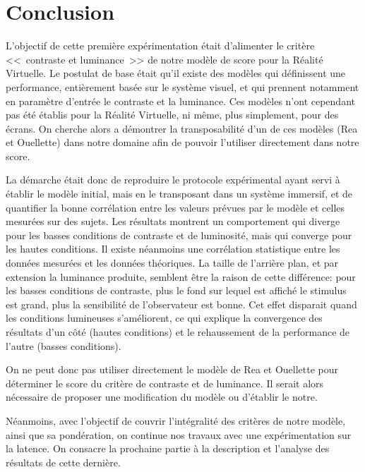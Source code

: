 \chapter*{Conclusion}
\par L'objectif de cette première expérimentation était d'alimenter le critère <<~contraste et luminance~>> de notre modèle de score pour la Réalité Virtuelle. Le postulat de base était qu'il existe des modèles qui définissent une performance, entièrement basée sur le système visuel, et qui prennent notamment en paramètre d'entrée le contraste et la luminance. Ces modèles n'ont cependant pas été établis pour la Réalité Virtuelle, ni même, plus simplement, pour des écrans. On cherche alors a démontrer la transposabilité d'un de ces modèles (Rea et Ouellette) dans notre domaine afin de pouvoir l'utiliser directement dans notre score.

\par La démarche était donc de reproduire le protocole expérimental ayant servi à établir le modèle initial, mais en le transposant  dans un système immersif, et de quantifier la bonne corrélation entre les valeurs prévues par le modèle et celles mesurées sur des sujets. Les résultats montrent un comportement qui diverge pour les basses conditions de contraste et de luminosité, mais qui converge pour les hautes conditions. Il existe néanmoins une corrélation statistique entre les données mesurées et les données théoriques. La taille de l'arrière plan, et par extension la luminance produite, semblent être la raison de cette différence: pour les basses conditions de contraste, plus le fond sur lequel est affiché le stimulus est grand, plus la sensibilité de l'observateur est bonne. Cet effet disparait quand les conditions lumineuses s'améliorent, ce qui explique la convergence des résultats d'un côté (hautes conditions) et le rehaussement de la performance de l'autre (basses conditions).

\par On ne peut donc pas utiliser directement le modèle de Rea et Ouellette pour déterminer le score du critère de contraste et de luminance. Il serait alors nécessaire de proposer une modification du modèle ou d'établir le notre.

\par Néanmoins, avec l'objectif de couvrir l'intégralité des critères de notre modèle, ainsi que sa pondération, on continue nos travaux avec une expérimentation sur la latence. On consacre la prochaine partie à la description et l'analyse des résultats de cette dernière.